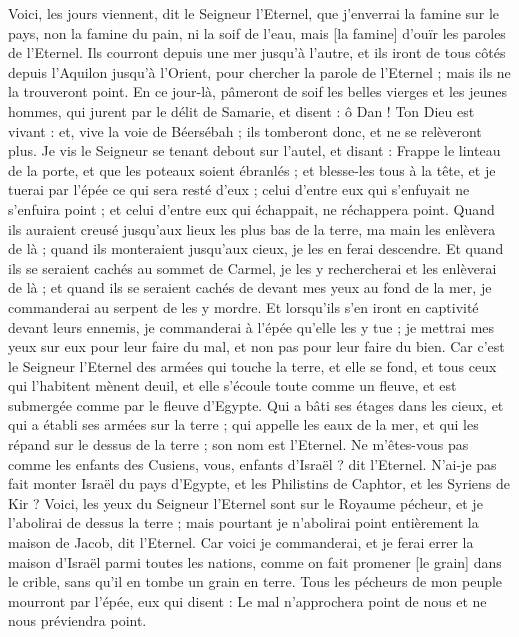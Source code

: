 \begin{multicols}{2}
Voici, les jours viennent, dit le Seigneur l'Eternel, que j'enverrai la famine sur le pays, non la famine du pain, ni la soif de l'eau, mais [la famine] d'ouïr les paroles de l'Eternel.
Ils courront depuis une mer jusqu'à l'autre, et ils iront de tous côtés depuis l'Aquilon jusqu'à l'Orient, pour chercher la parole de l'Eternel ; mais ils ne la trouveront point.
En ce jour-là, pâmeront de soif les belles vierges et les jeunes hommes,
qui jurent par le délit de Samarie, et disent : ô Dan ! Ton Dieu est vivant : et, vive la voie de Béersébah ; ils tomberont donc, et ne se relèveront plus.
\VerseOne{}Je vis le Seigneur se tenant debout sur l'autel, et disant : Frappe le linteau de la porte, et que les poteaux soient ébranlés ; et blesse-les tous à la tête, et je tuerai par l'épée ce qui sera resté d'eux ; celui d'entre eux qui s'enfuyait ne s'enfuira point ; et celui d'entre eux qui échappait, ne réchappera point.
Quand ils auraient creusé jusqu'aux lieux les plus bas de la terre, ma main les enlèvera de là ; quand ils monteraient jusqu'aux cieux, je les en ferai descendre.
Et quand ils se seraient cachés au sommet de Carmel, je les y rechercherai et les enlèverai de là ; et quand ils se seraient cachés de devant mes yeux au fond de la mer, je commanderai au serpent de les y mordre.
Et lorsqu'ils s'en iront en captivité devant leurs ennemis, je commanderai à l'épée qu'elle les y tue ; je mettrai mes yeux sur eux pour leur faire du mal, et non pas pour leur faire du bien.
Car c'est le Seigneur l'Eternel des armées qui touche la terre, et elle se fond, et tous ceux qui l'habitent mènent deuil, et elle s'écoule toute comme un fleuve, et est submergée comme par le fleuve d'Egypte.
Qui a bâti ses étages dans les cieux, et qui a établi ses armées sur la terre ; qui appelle les eaux de la mer, et qui les répand sur le dessus de la terre ; son nom est l'Eternel.
Ne m'êtes-vous pas comme les enfants des Cusiens, vous, enfants d'Israël ? dit l'Eternel. N'ai-je pas fait monter Israël du pays d'Egypte, et les Philistins de Caphtor, et les Syriens de Kir ?
Voici, les yeux du Seigneur l'Eternel sont sur le Royaume pécheur, et je l'abolirai de dessus la terre ; mais pourtant je n'abolirai point entièrement la maison de Jacob, dit l'Eternel.
Car voici je commanderai, et je ferai errer la maison d'Israël parmi toutes les nations, comme on fait promener [le grain] dans le crible, sans qu'il en tombe un grain en terre.
Tous les pécheurs de mon peuple mourront par l'épée, eux qui disent : Le mal n'approchera point de nous et ne nous préviendra point.

\end{multicols}
